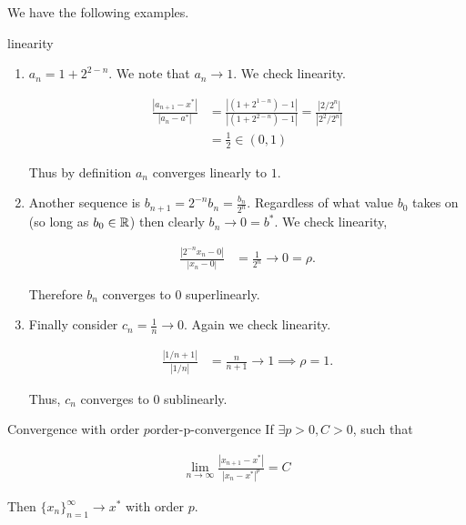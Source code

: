 \documentclass[10pt]{article}
\begin{document}
We have the following examples.

\begin{myexample}{}{linearity}
    \begin{enumerate}[label = (\roman*)]
        \item $a_n = 1+2^{2-n}$. We note that $a_{n}\to 1$. We check linearity.

        \begin{align*}
            \frac{|a_{n+1}-x^*|}{|a_{n}-a^*|} &= \frac{|(1+2^{1-n})-1|}{|(1+2^{2-n})-1|} = \frac{|2/2^{n}|}{|2^{2} / 2^{n}|}\\
            &= \frac{1}{2} \in (0,1)
        \end{align*}

        Thus by definition $a_{n}$ converges linearly to $1$.

        \item Another sequence is $b_{n+1}=2^{-n}b_{n} = \frac{b_{n}}{2^{n}}$. Regardless of what value $b_{0}$ takes on (so long as $b_{0}\in\mathbb{R}$) then clearly $b_{n}\to 0 = b^{*}$. We check linearity,

        \begin{align*}
            \frac{|2^{-n}x_{n} -0|}{|x_{n}-0|} &= \frac{1}{2^{n}}\to 0 = \rho.
        \end{align*}

        Therefore $b_{n}$ converges to $0$ superlinearly.

        \item Finally consider $c_{n} = \frac{1}{n} \to 0$. Again we check linearity.

        \begin{align*}
            \frac{|1/n+1|}{|1/n|} &= \frac{n}{n+1} \to 1 \implies \rho = 1.
        \end{align*}

        Thus, $c_{n}$ converges to $0$ sublinearly.
        
    \end{enumerate}
\end{myexample}

\begin{mydefinition}{Convergence with order $p$}{order-p-convergence}
    If $\exists p >0, C>0$, such that

    \begin{align*}
        \lim_{n\to\infty} \frac{|x_{n+1}-x^{*}|}{|x_{n}-x^{*}|^{p}} = C
    \end{align*}

    Then $\{x_{n}\}_{n=1}^{\infty}\to x^*$ with order $p$.
\end{mydefinition}
\end{document}
